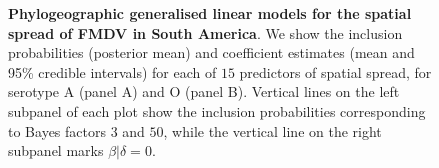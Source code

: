 \documentclass[10pt]{article}
\begin{document}
\begin{figure}[!ht]
\begin{center}
\end{center}
\caption{\textbf{Phylogeographic generalised linear models for the spatial spread of FMDV in South America}.
We show the inclusion probabilities (posterior mean) and coefficient estimates (mean and 95\% credible intervals) for each of $15$ predictors of spatial spread, for serotype A (panel A) and O (panel B).
Vertical lines on the left subpanel of each plot show the inclusion probabilities corresponding to Bayes factors $3$ and $50$, while the vertical line on the right subpanel marks $\beta | \delta = 0$.
}
\label{fig:glm_spatial}
\end{figure}
\end{document}
